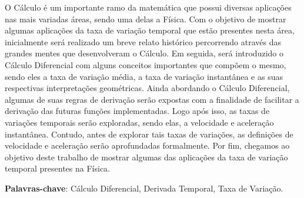 \documentclass[
	12pt,				%
	openright,			%
    twoside,			%
	a4paper,			%
	chapter=TITLE,		%
	english,			%
	french,				%
	spanish,			%
	brazil				%
	]{abntex2}
\numberwithin{lema}{chapter}
\numberwithin{teorema}{chapter}
\numberwithin{definicao}{chapter}
\numberwithin{exemplo}{chapter}
\numberwithin{figure}{chapter}
\begin{document}
\setlength{\absparsep}{18pt} %
\begin{resumo}[RESUMO]
	
O Cálculo é um importante ramo da matemática que possui diversas aplicações nas mais variadas áreas, sendo uma delas a Física. Com o objetivo de mostrar algumas aplicações da taxa de variação temporal que estão presentes nesta área, inicialmente será realizado um breve relato histórico percorrendo através das grandes mentes que desenvolveram o Cálculo. Em seguida, será introduzido o Cálculo Diferencial com alguns conceitos importantes que compõem o mesmo, sendo eles a taxa de variação média, a taxa de variação instantânea e as suas respectivas interpretações geométricas. Ainda abordando o Cálculo Diferencial, algumas de suas regras de derivação serão expostas com a finalidade de facilitar a derivação das futuras funções implementadas. Logo após isso, as taxas de variações temporais serão exploradas, sendo elas, a velocidade e aceleração instantânea. Contudo, antes de explorar tais taxas de variações, as definições de velocidade e aceleração serão aprofundadas formalmente. Por fim, chegamos ao objetivo deste trabalho de mostrar algumas das aplicações da taxa de variação temporal presentes na Física.

\textbf{Palavras-chave}: Cálculo Diferencial, Derivada Temporal, Taxa de Variação.

\end{resumo}

\listoffigures*
\cleardoublepage

\listoftables*
\cleardoublepage


\end{document}
